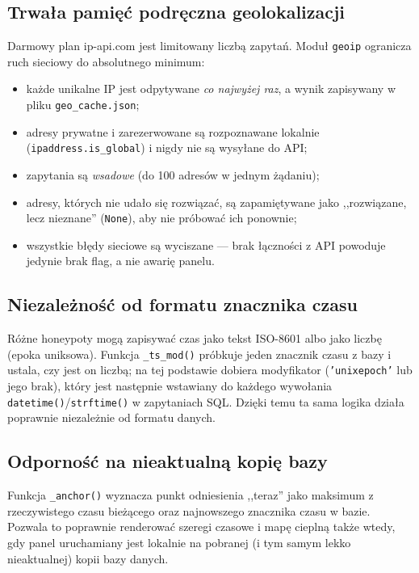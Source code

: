 \documentclass[12pt,a4paper]{report}
\begin{document}
\subsection{Trwała pamięć podręczna geolokalizacji}

Darmowy plan ip-api.com jest limitowany liczbą zapytań. Moduł \texttt{geoip}
ogranicza ruch sieciowy do absolutnego minimum:

\begin{itemize}
  \item każde unikalne IP jest odpytywane \emph{co najwyżej raz}, a wynik
        zapisywany w pliku \texttt{geo\_cache.json};
  \item adresy prywatne i zarezerwowane są rozpoznawane lokalnie
        (\texttt{ipaddress.is\_global}) i nigdy nie są wysyłane do API;
  \item zapytania są \emph{wsadowe} (do 100 adresów w jednym żądaniu);
  \item adresy, których nie udało się rozwiązać, są zapamiętywane jako
        ,,rozwiązane, lecz nieznane'' (\texttt{None}), aby nie próbować ich
        ponownie;
  \item wszystkie błędy sieciowe są wyciszane --- brak łączności z API powoduje
        jedynie brak flag, a nie awarię panelu.
\end{itemize}

\subsection{Niezależność od formatu znacznika czasu}

Różne honeypoty mogą zapisywać czas jako tekst ISO-8601 albo jako liczbę
(epoka uniksowa). Funkcja \texttt{\_ts\_mod()} próbkuje jeden znacznik czasu
z bazy i ustala, czy jest on liczbą; na tej podstawie dobiera modyfikator
(\texttt{'unixepoch'} lub jego brak), który jest następnie wstawiany do każdego
wywołania \texttt{datetime()}/\texttt{strftime()} w zapytaniach SQL. Dzięki temu
ta sama logika działa poprawnie niezależnie od formatu danych.

\subsection{Odporność na nieaktualną kopię bazy}

Funkcja \texttt{\_anchor()} wyznacza punkt odniesienia ,,teraz'' jako maksimum
z rzeczywistego czasu bieżącego oraz najnowszego znacznika czasu w bazie.
Pozwala to poprawnie renderować szeregi czasowe i mapę cieplną także wtedy, gdy
panel uruchamiany jest lokalnie na pobranej (i tym samym lekko nieaktualnej)
kopii bazy danych.
\end{document}

